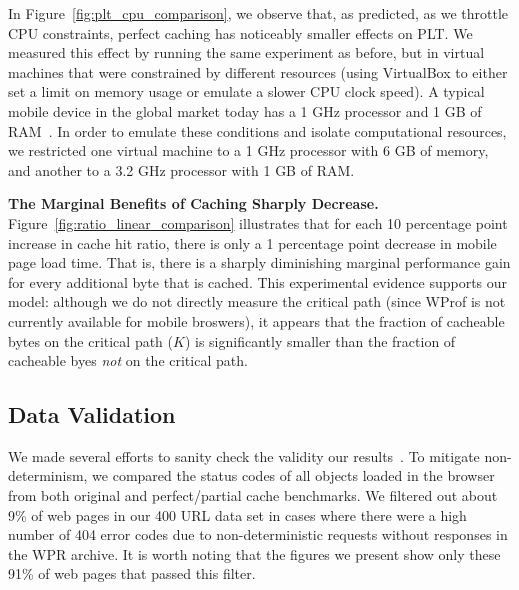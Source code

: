 In Figure~\ref{fig:plt_cpu_comparison}, we observe that, as predicted,
as we throttle CPU constraints, perfect caching has noticeably smaller effects on PLT. %
We measured this effect by running the same experiment as before, but in virtual machines that were constrained by different resources (using VirtualBox to either set a limit on memory usage or emulate a slower CPU clock speed).
A typical mobile device in the global market today has a 1 GHz processor and 1 GB of RAM~\cite{mobile-stats}. In order to emulate these conditions and isolate computational resources, we restricted one virtual machine to a 1 GHz processor with 6 GB of memory, and another to a 3.2 GHz processor with 1 GB of RAM.

{\bf The Marginal Benefits of Caching Sharply Decrease.}
Figure~\ref{fig:ratio_linear_comparison} illustrates that for each 10 percentage point increase in cache hit ratio, there is only
a 1 percentage point decrease in mobile page load time.
That is, there is a sharply diminishing marginal performance gain for 
every additional byte that is cached.
This experimental evidence supports our model:
although we do not directly measure the critical path (since WProf is not currently available for mobile broswers), it appears that the fraction of cacheable bytes on the critical path ($K$) is
significantly smaller than the fraction of cacheable byes {\it not} on
the critical path.

% 


\subsection{Data Validation}
\label{subsec:validation}
We made several efforts to sanity check the validity our results~\cite{sanity-checks}. To mitigate non-determinism, we compared the status codes of all objects loaded in the browser from both original and perfect/partial cache benchmarks. We filtered out about 9\% of web pages in our 400 URL data set in cases where there were a high number of 404 error codes due to non-deterministic requests without responses in the WPR archive. It is worth noting that the figures we present show only these 91\% of web pages that passed this filter.

